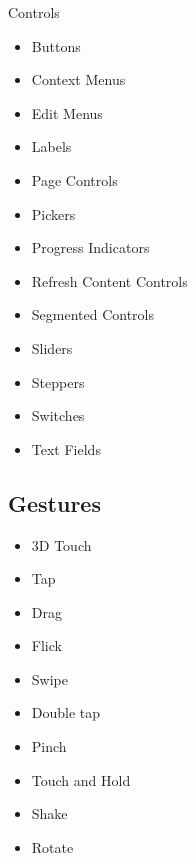 	Controls
	\begin{itemize}
  		\vspace{-0.4cm}\item Buttons
		\vspace{-0.4cm}\item Context Menus
		\vspace{-0.4cm}\item Edit Menus
		\vspace{-0.4cm}\item Labels
		\vspace{-0.4cm}\item Page Controls
		\vspace{-0.4cm}\item Pickers
		\vspace{-0.4cm}\item Progress Indicators
		\vspace{-0.4cm}\item Refresh Content Controls
		\vspace{-0.4cm}\item Segmented Controls
		\vspace{-0.4cm}\item Sliders
		\vspace{-0.4cm}\item Steppers
		\vspace{-0.4cm}\item Switches
		\vspace{-0.4cm}\item Text Fields
	\end{itemize}

\subsection {Gestures}

	\begin{itemize}
  		\vspace{-0.4cm}\item 3D Touch
		\vspace{-0.4cm}\item Tap
		\vspace{-0.4cm}\item Drag
		\vspace{-0.4cm}\item Flick
		\vspace{-0.4cm}\item Swipe
		\vspace{-0.4cm}\item Double tap
		\vspace{-0.4cm}\item Pinch
		\vspace{-0.4cm}\item Touch and Hold
		\vspace{-0.4cm}\item Shake
		\vspace{-0.4cm}\item Rotate
	\end{itemize}

